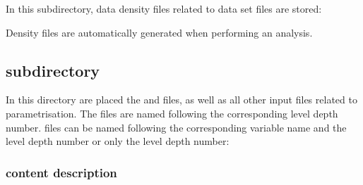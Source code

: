 In this subdirectory, data density files related to data set files are stored:

\begin{center}
\end{center}


\btips

 Density files are automatically generated when performing an analysis.

\etips

\subsection[DIVA3D/divastripped/input/divaparam directory]{ subdirectory}

In this directory are placed the   and  files, as well as all other input files related to \diva parametrisation. The   files are named following the corresponding level depth number.  files can be named following the  corresponding variable name and the level depth number or only the level depth number:


\begin{center}
\end{center}



\subsubsection[input/divaparam content description]{ content description}

